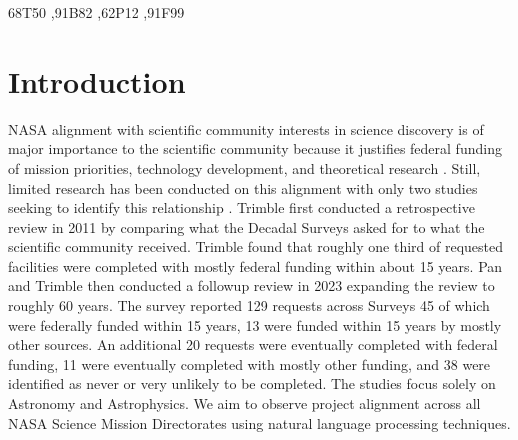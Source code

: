 \documentclass[preprint,12pt,doubleblind]{elsarticle}
\begin{document}
\begin{frontmatter}
\begin{keyword}
\MSC 68T50 \sep 91B82 \sep 62P12 \sep 91F99
\end{keyword}

\end{frontmatter}



\section{Introduction}

NASA alignment with scientific community interests in science discovery is of major importance to the scientific community because it justifies federal funding of mission priorities, technology development, and theoretical research \cite{nasa_smd_hearing_2024}. Still, limited research has been conducted on this alignment with only two studies seeking to identify this relationship \cite{Trimble2011} \cite {pan2023seven_Decadals}. Trimble first conducted a retrospective review in 2011 by comparing what the Decadal Surveys asked for to what the scientific community received. Trimble found that roughly one third of requested facilities were completed with mostly federal funding within about 15 years. Pan and Trimble then conducted a followup review in 2023 expanding the review to roughly 60 years.  The survey reported 129 requests across Surveys 45 of which were federally funded within 15 years, 13 were funded within 15 years by mostly other sources. An additional 20 requests were eventually completed with federal funding, 11 were eventually completed with mostly other funding, and 38 were identified as never or very unlikely to be completed. The studies focus solely on Astronomy and Astrophysics. We aim to observe project alignment across all NASA Science Mission Directorates using natural language processing techniques. 
\end{document}

